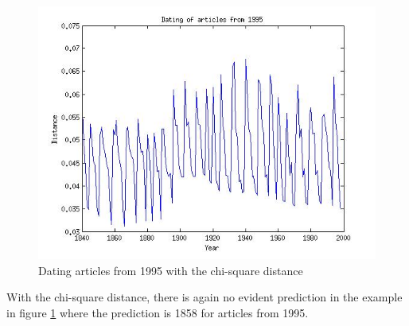 \begin{figure}[H]
\begin{minipage}[b]{0.3\linewidth}
	\includegraphics[scale=0.25]{Pictures/date_articles/chi2/dating1995_corrected.jpg}
        \caption{Dating articles from 1995 with the chi-square distance}
        \label{date_chi2}
    \end{minipage}
\end{figure}
With the chi-square distance, there is again no evident prediction in the example in figure \ref{date_chi2} where the prediction is 1858 for articles from 1995.
